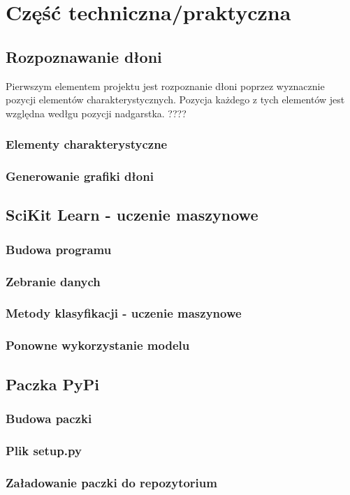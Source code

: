 \chapter{Część techniczna/praktyczna}
\section{Rozpoznawanie dłoni}

Pierwszym elementem projektu jest rozpoznanie dłoni poprzez wyznacznie pozycji elementów charakterystycznych. Pozycja każdego z tych elementów jest względna wedłgu pozycji nadgarstka. ????



\subsection{Elementy charakterystyczne}
\subsection{Generowanie grafiki dłoni}

\section{SciKit Learn - uczenie maszynowe}
\subsection{Budowa programu}
\subsection{Zebranie danych}
\subsection{Metody klasyfikacji - uczenie maszynowe}
\subsection{Ponowne wykorzystanie modelu}

\section{Paczka PyPi}
\subsection{Budowa paczki}
\subsection{Plik setup.py}
\subsection{Załadowanie paczki do repozytorium}

